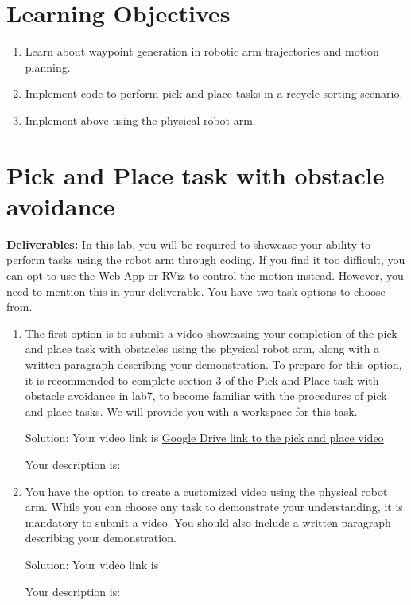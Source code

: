 \documentclass[12pt]{article}
\begin{document}
	\MakeScribeTop


\section{Learning Objectives}
\begin{enumerate}
    \item Learn about waypoint generation in robotic arm trajectories and motion planning.
    
    \item Implement code to perform pick and place tasks in a recycle-sorting scenario.
    
    \item Implement above using the physical robot arm. 
    
\end{enumerate}


\section{Pick and Place task with obstacle avoidance}
\textbf{Deliverables:}
In this lab, you will be required to showcase your ability to perform tasks using the robot arm through coding. If you find it too difficult, you can opt to use the Web App or RViz to control the motion instead. However, you need to mention this in your deliverable. You have two task options to choose from.
\begin{enumerate}
    
    \item The first option is to submit a video showcasing your completion of the pick and place task with obstacles using the physical robot arm, along with a written paragraph describing your demonstration. To prepare for this option, it is recommended to complete section 3 of the Pick and Place task with obstacle avoidance in lab7, to become familiar with the procedures of pick and place tasks. We will provide you with a workspace for this task.
    
    Solution:
    Your video link is \href{https://drive.google.com/drive/folders/1SjXxjI0upjJjGLavEv96zVzDqk9hiY-5?usp=sharing}{Google Drive link to the pick and place video}
    
    Your description is:
    
    \item You have the option to create a customized video using the physical robot arm. While you can choose any task to demonstrate your understanding, it is mandatory to submit a video. You should also include a written paragraph describing your demonstration. 
    
    Solution:
    Your video link is
    
    Your description is:
    
\end{enumerate}
\end{document}
